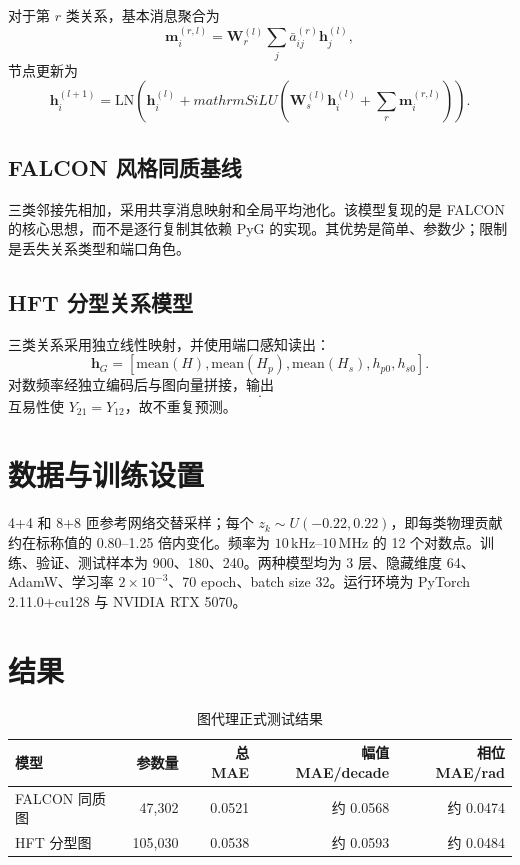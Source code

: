 \documentclass[10pt,a4paper]{ctexart}
\begin{document}
对于第 $r$ 类关系，基本消息聚合为
\begin{equation}
 \bm m_i^{(r,l)}=\bm W_r^{(l)}\sum_j\bar a_{ij}^{(r)}\bm h_j^{(l)},
\end{equation}
节点更新为
\begin{equation}
 \bm h_i^{(l+1)}=\mathrm{LN}\!\left(\bm h_i^{(l)}+mathrm{SiLU}\left(\bm W_s^{(l)}\bm h_i^{(l)}+\sum_r\bm m_i^{(r,l)}\right)\right).
\end{equation}

\subsection{FALCON 风格同质基线}
三类邻接先相加，采用共享消息映射和全局平均池化。该模型复现的是 FALCON 的核心思想，而不是逐行复制其依赖 PyG 的实现。其优势是简单、参数少；限制是丢失关系类型和端口角色。

\subsection{HFT 分型关系模型}
三类关系采用独立线性映射，并使用端口感知读出：
\begin{equation}
\bm h_G=[\mathrm{mean}(H),\mathrm{mean}(H_p),\mathrm{mean}(H_s),h_{p0},h_{s0}].
\end{equation}
对数频率经独立编码后与图向量拼接，输出
\begin{equation}
[\log_{10}|Y_{11}|,\log_{10}|Y_{22}|,\log_{10}|Y_{12}|,
\angle Y_{11},\angle Y_{22},\angle Y_{12}].
\end{equation}
互易性使 $Y_{21}=Y_{12}$，故不重复预测。

\section{数据与训练设置}
4+4 和 8+8 匝参考网络交替采样；每个 $z_k\sim U(-0.22,0.22)$，即每类物理贡献约在标称值的 0.80--1.25 倍内变化。频率为 $10\,$kHz--$10\,$MHz 的 12 个对数点。训练、验证、测试样本为 900、180、240。两种模型均为 3 层、隐藏维度 64、AdamW、学习率 $2\times10^{-3}$、70 epoch、batch size 32。运行环境为 PyTorch 2.11.0+cu128 与 NVIDIA RTX 5070。

\section{结果}
\begin{table}[H]\centering
\caption{图代理正式测试结果}
\begin{tabular}{lrrrr}\toprule
模型 & 参数量 & 总 MAE & 幅值 MAE/decade & 相位 MAE/rad\\\midrule
FALCON 同质图 & 47,302 & 0.0521 & 约 0.0568 & 约 0.0474\\
HFT 分型图 & 105,030 & 0.0538 & 约 0.0593 & 约 0.0484\\\bottomrule
\end{tabular}
\end{table}
\end{document}
